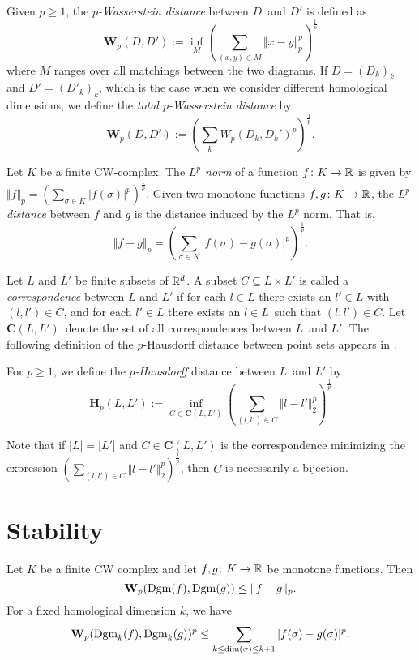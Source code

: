 	\begin{defn}
		Given $p\geq 1$, the \textit{$p$-Wasserstein distance} between $D$ and $D'$ is defined as
		$$
			\textbf{W}_p(D,D') := \inf_{M} \left(\sum_{(x,y)\in M}\Vert x-y\Vert^p_p\right)^{\frac{1}{p}}
		$$
		where $M$ ranges over all matchings between the two diagrams. If $D=(D_k)_k$ and $D'=(D'_k)_k$, which is the case when we consider different homological dimensions, we define the \textit{total $p$-Wasserstein distance} by
		$$
			\textbf{W}_p(D,D') := \left(\sum_k W_p(D_k,D_k')^p\right)^{\frac{1}{p}}.
		$$
	\end{defn}

	\begin{defn}[$L^p$ norm]
		Let $K$ be a finite CW-complex. The \textit{$L^p$ norm} of a function $f\colon K\to\mathbb{R}$ is given by $\Vert f\Vert_p = \left(\sum_{\sigma\in K}\vert f(\sigma)\vert^p\right)^{\frac{1}{p}}$. Given two monotone functions $f,g\colon K\to\mathbb{R}$, the \textit{$L^p$ distance} between $f$ and $g$ is the distance induced by the $L^p$ norm. That is,
		$$
		\Vert f-g\Vert_p = \left(\sum_{\sigma\in K}\vert f(\sigma) - g(\sigma)\vert^p\right)^{\frac{1}{p}}.
		$$
	\end{defn}

	 Let $L$ and $L'$ be finite subsets of $\mathbb{R}^d$. A subset $C\subseteq L\times L'$ is called a \textit{correspondence} between $L$ and $L'$ if for each $l\in L$ there exists an $l'\in L$ with $(l,l')\in C$, and for each $l'\in L$ there exists an $l\in L$ such that $(l,l')\in C$. Let $\textbf{C}(L,L')$ denote the set of all correspondences between $L$ and $L'$. The following definition of the $p$-Hausdorff distance between point sets appears in \autocite{cao2022approximating}.

	\begin{defn}
		For $p\geq 1$, we define the \textit{$p$-Hausdorff} distance between $L$ and $L'$ by
		$$
		\textbf{H}_p(L,L') := \inf_{C\in\textbf{C}(L,L')}\left(\sum_{(l,l')\in C}\Vert l - l'\Vert_2^p\right)^{\frac{1}{p}}
		$$
	\end{defn}


	Note that if $|L|=|L'|$ and $C\in\textbf{C}(L,L')$ is the correspondence minimizing the expression $\left(\sum_{(l,l')\in C}\Vert l - l'\Vert_2^p\right)^{\frac{1}{p}}$, then $C$ is necessarily a bijection.

	\section{Stability}
	\begin{thm}\label{thm:cellular_wasserstein_stability}
		Let $K$ be a finite CW complex and let $f,g\colon K\to\mathbb{R}$ be monotone functions. Then
		$$
			\textbf{W}_p(\operatorname{Dgm}(f), \operatorname{Dgm}(g))\leq\Vert f-g\Vert_p.
		$$
		For a fixed homological dimension $k$, we have
		$$
			\textbf{W}_p(\operatorname{Dgm}_k(f), \operatorname{Dgm}_k(g))^p \leq \sum_{k\leq \dim(\sigma)\leq k+1}\vert f(\sigma)-g(\sigma)\vert^p.
		$$
	\end{thm}

